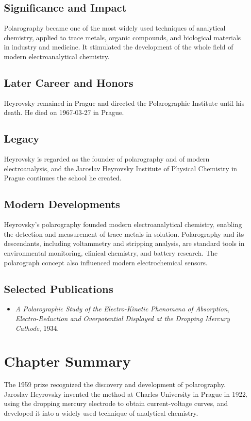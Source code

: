 \subsection*{Significance and Impact}

Polarography became one of the most widely used techniques of analytical chemistry, applied to trace metals, organic compounds, and biological materials in industry and medicine. It stimulated the development of the whole field of modern electroanalytical chemistry.

\subsection*{Later Career and Honors}

Heyrovsky remained in Prague and directed the Polarographic Institute until his death. He died on 1967-03-27 in Prague.

\subsection*{Legacy}

Heyrovsky is regarded as the founder of polarography and of modern electroanalysis, and the Jaroslav Heyrovsky Institute of Physical Chemistry in Prague continues the school he created.

\subsection*{Modern Developments}

Heyrovsky's polarography founded modern electroanalytical chemistry, enabling the detection and measurement of trace metals in solution. Polarography and its descendants, including voltammetry and stripping analysis, are standard tools in environmental monitoring, clinical chemistry, and battery research. The polarograph concept also influenced modern electrochemical sensors.

\subsection*{Selected Publications}

\begin{itemize}

\item \emph{A Polarographic Study of the Electro-Kinetic Phenomena of Absorption, Electro-Reduction and Overpotential Displayed at the Dropping Mercury Cathode}, 1934.

\end{itemize}

\clearpage

\section*{Chapter Summary}

The 1959 prize recognized the discovery and development of polarography. Jaroslav Heyrovsky invented the method at Charles University in Prague in 1922, using the dropping mercury electrode to obtain current-voltage curves, and developed it into a widely used technique of analytical chemistry.

